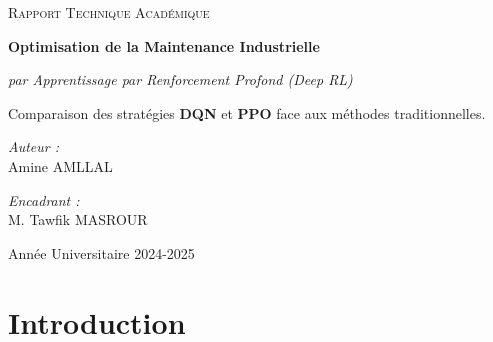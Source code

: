 \documentclass[11pt,a4paper]{report}
\begin{document}
\begin{titlepage}
    \centering
    \vspace*{2cm}
    
    {\scshape\Large Rapport Technique Académique \par}
    \vspace{0.5cm}
    {\sffamily\bfseries\Huge\color{mainblue} Optimisation de la Maintenance Industrielle \par}
    \vspace{0.3cm}
    {\Large\itshape par Apprentissage par Renforcement Profond (Deep RL) \par}
    
    \vspace{2cm}
    
    \begin{tcolorbox}[colback=lightgray, colframe=white, arc=0mm, boxrule=0pt]
        \centering
        \vspace{0.5cm}
        Comparaison des stratégies \textbf{DQN} et \textbf{PPO} face aux méthodes traditionnelles.
        \vspace{0.5cm}
    \end{tcolorbox}

    \vspace{3cm}

    \begin{minipage}{0.4\textwidth}
        \begin{flushleft} \large
        \emph{Auteur :}\\
        Amine \textsc{AMLLAL}
        \end{flushleft}
    \end{minipage}
    \hfill
    \begin{minipage}{0.4\textwidth}
        \begin{flushright} \large
        \emph{Encadrant :}\\
        M. Tawfik \textsc{MASROUR}
        \end{flushright}
    \end{minipage}

    \vfill
    {\large Année Universitaire 2024-2025 \par}
    \vspace{1cm}
\end{titlepage}

\tableofcontents
\newpage


\chapter{Introduction}
\end{document}
